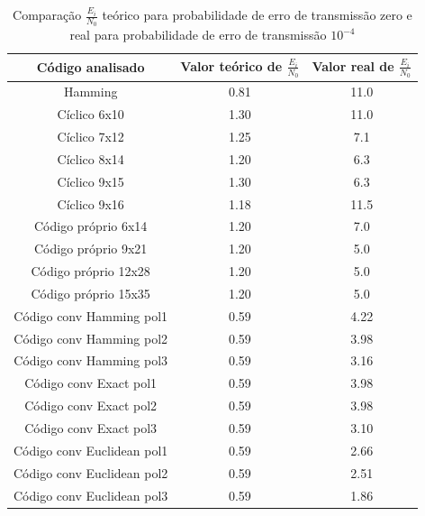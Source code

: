 \begin{table}[h]
\centering
\caption {Comparação $\frac{E_i}{N_0}$ teórico para probabilidade de erro de transmissão zero e real para probabilidade de erro de transmissão $10^{-4}$} \label{tab:teorico} 
\begin{tabular}{|c|c|c|}
	\hline 
Código analisado	&  Valor teórico de $\frac{E_i}{N_0}$  & Valor real de $\frac{E_i}{N_0}$\\
	\hline 
	Hamming	&  0.81 & 11.0\\ 
	\hline 
	Cíclico 6x10	&  1.30 & 11.0\\ 
	\hline 
	Cíclico 7x12	&  1.25 & 7.1\\ 
	\hline 
	Cíclico 8x14	&  1.20 & 6.3\\ 
	\hline 
	Cíclico 9x15	&  1.30 & 6.3\\ 
	\hline 
	Cíclico 9x16	&  1.18 & 11.5\\ 
	\hline 
	Código próprio 6x14	&  1.20 & 7.0\\ 
	\hline 
	Código próprio 9x21	&  1.20 & 5.0\\ 
	\hline 
	Código próprio 12x28	&  1.20 & 5.0\\ 
	\hline 
	Código próprio 15x35	&  1.20 & 5.0\\ 
	\hline 
	Código conv Hamming pol1	&  0.59 & 4.22\\ 
	\hline 
	Código conv Hamming pol2	&  0.59 & 3.98\\ 
	\hline 
	Código conv Hamming pol3	&  0.59 & 3.16\\ 
	\hline
	Código conv Exact pol1	&  0.59 & 3.98\\ 
	\hline 
	Código conv Exact pol2	&  0.59 & 3.98\\ 
	\hline 
	Código conv Exact pol3	&  0.59 & 3.10\\ 
	\hline
	Código conv Euclidean pol1	&  0.59 & 2.66\\ 
	\hline 
	Código conv Euclidean pol2	&  0.59 & 2.51\\ 
	\hline 
	Código conv Euclidean pol3	&  0.59 & 1.86\\ 
	\hline
	
\end{tabular} 

\end{table}
%
%
